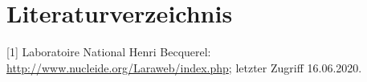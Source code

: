 \section{Literaturverzeichnis}
\label{sec:Diskussion}

[1] Laboratoire National Henri Becquerel:
\url{http://www.nucleide.org/Laraweb/index.php}; letzter Zugriff 16.06.2020.
